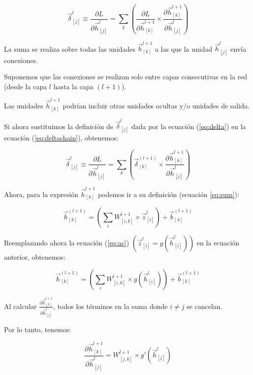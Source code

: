 \begin{equation}
\vec{\delta}_{[j]}^l \equiv \frac{\partial L}{\partial \vec{h}_{[j]}^l} = \sum_{k}\left( \frac{\partial L}{\partial \vec{h}_{[k]}^{l+1}} \times \frac{\partial \vec{h}_{[k]}^{l+1}}{\partial \vec{h}_{[j]}^l}\right)
\label{eq:deltachain}
\end{equation}

La suma se realiza sobre todas las unidades $\vec{h}_{[k]}^{l+1}$ a las que la unidad $\vec{h}_{[j]}^l$ envía conexiones.

Suponemos que las conexiones se realizan solo entre capas consecutivas en la red (desde la capa $l$ hasta la capa $(l+1)$).

Las unidades $\vec{h}_{[k]}^{l+1}$ podrían incluir otras unidades ocultas y/o unidades de salida.

Si ahora sustituimos la definición de $\vec{\delta}_{[j]}^l$ dada por la ecuación (\ref{eq:delta}) en la ecuación (\ref{eq:deltachain}), obtenemos:

\begin{equation}
\vec{\delta}_{[j]}^l \equiv \frac{\partial L}{\partial \vec{h}_{[j]}^l} = \sum_{k}\left( \vec{\delta}_{[k]}^{(l+1)}  \times \frac{\partial \vec{h}_{[k]}^{l+1}}{\partial \vec{h}_{[j]}^l} \right)
\label{eq:delta2}
\end{equation}

Ahora, para la expresión $\vec{h}_{[k]}^{l+1}$ podemos ir a su definición (ecuación \ref{eq:sum}):

\begin{displaymath}
\vec{h}_{[k]}^{(l+1)} = \left( \sum_{i} W_{[i,k]}^{l+1} \times \vec{z}_{[i]}^{l}\right) + \vec{b}_{[k]}^{(l+1)}
\end{displaymath}

Reemplazando ahora la ecuación (\ref{eq:ac}) $(\vec{z}_{[i]}^{l} = g(\vec{h}_{[i]}^{l}))$ en la ecuación anterior, obtenemos:

\begin{displaymath}
\vec{h}_{[k]}^{(l+1)} = \left( \sum_{i}   W_{[i,k]}^{l+1} \times g(\vec{h}_{[i]}^{l})\right)  + \vec{b}_{[k]}^{(l+1)}
\end{displaymath}

Al calcular $\frac{\partial \vec{h}_{[k]}^{l+1}}{\partial \vec{h}_{[j]}^l}$, todos los términos en la suma donde $i \neq j$ se cancelan.

Por lo tanto, tenemos:

\begin{equation}
\frac{\partial \vec{h}_{[k]}^{l+1}}{\partial \vec{h}_{[j]}^l} =  W_{[j,k]}^{l+1} \times g'(\vec{h}_{[j]}^{l})
\label{eq:partialhh}
\end{equation}

